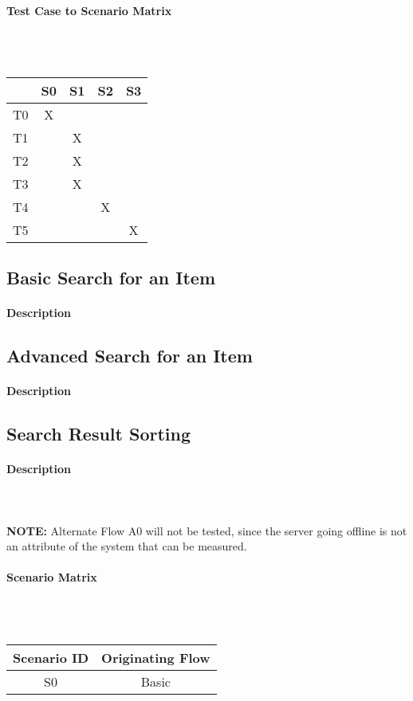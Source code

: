 \documentclass{article}
\begin{document}
\paragraph{Test Case to Scenario Matrix}~\\ \\
\begin{tabular}{ | c || c | c | c | c | }
\hline
    & S0 & S1 & S2 & S3\\
\hline
\hline
T0 & X  &    &    &    \\
\hline
T1 &    & X  &    &    \\
\hline
T2 &    & X  &    &    \\
\hline
T3 &    & X  &    &    \\
\hline
T4 &    &    & X  &    \\
\hline
T5 &    &    &    & X  \\
\hline
\end{tabular}

\subsection{Basic Search for an Item}
\paragraph{Description}


\subsection{Advanced Search for an Item}
\paragraph{Description}


\subsection{Search Result Sorting}
\paragraph{Description}
~\\ \\
\textbf{NOTE:} Alternate Flow A0 will not be tested, since the server going offline is not an attribute of the system that can be measured.
\paragraph{Scenario Matrix}~\\ \\
\begin{tabular}{ c  c }
\hline
Scenario ID & Originating Flow\\
\hline
\hline
S0 & Basic\\
\hline
\end{tabular}\\
~\\
~\\
\end{document}

